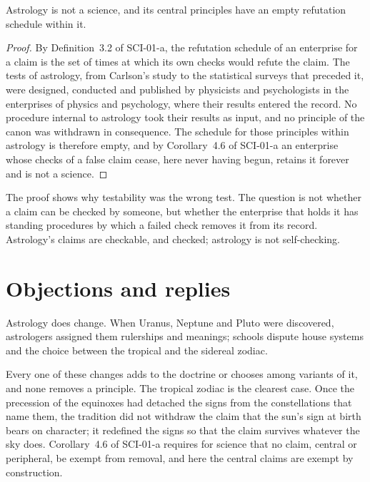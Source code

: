 \documentclass{situationist-preprint}
\begin{document}
\begin{proposition}\label{p:astro}
Astrology is not a science, and its central principles have an empty refutation schedule within it.
\end{proposition}

\begin{proof}
By Definition~3.2 of SCI-01-a, the refutation schedule of an enterprise for a claim is the set of times at which its own checks would refute the claim. The tests of astrology, from Carlson's study to the statistical surveys that preceded it, were designed, conducted and published by physicists and psychologists in the enterprises of physics and psychology, where their results entered the record. No procedure internal to astrology took their results as input, and no principle of the canon was withdrawn in consequence. The schedule for those principles within astrology is therefore empty, and by Corollary~4.6 of SCI-01-a an enterprise whose checks of a false claim cease, here never having begun, retains it forever and is not a science.
\end{proof}

The proof shows why testability was the wrong test. The question is not whether a claim can be checked by someone, but whether the enterprise that holds it has standing procedures by which a failed check removes it from its record. Astrology's claims are checkable, and checked; astrology is not self-checking.

\section{Objections and replies}\label{s:objections}

\begin{objection}[Revision]
Astrology does change. When Uranus, Neptune and Pluto were discovered, astrologers assigned them rulerships and meanings; schools dispute house systems and the choice between the tropical and the sidereal zodiac.
\end{objection}

\begin{reply}
Every one of these changes adds to the doctrine or chooses among variants of it, and none removes a principle. The tropical zodiac is the clearest case. Once the precession of the equinoxes had detached the signs from the constellations that name them, the tradition did not withdraw the claim that the sun's sign at birth bears on character; it redefined the signs so that the claim survives whatever the sky does. Corollary~4.6 of SCI-01-a requires for science that no claim, central or peripheral, be exempt from removal, and here the central claims are exempt by construction.
\end{reply}
\end{document}
